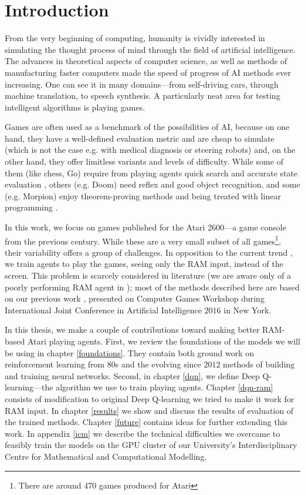 \chapter*{Introduction}
From the very beginning of computing, humanity is vividly interested in simulating the thought process of mind through the field of artificial intelligence. The advances in theoretical aspects of computer science, as well as methods of manufacturing faster computers made the speed of progress of AI methods ever increasing. One can see it in many domains---from self-driving cars, through machine translation, to speech synthesis. A particularly neat area for testing intelligent algorithms is playing games.

Games are often used as a benchmark of the possibilities of AI, because on one hand, they have a well-defined evaluation metric and are cheap to simulate (which is not the case e.g. with medical diagnosis or steering robots) and, on the other hand, they offer limitless variants and levels of difficulty. While some of them (like chess, Go) require from playing agents quick search and accurate state evaluation \cite{alphago}, others (e.g. Doom) need reflex and good object recognition, and some (e.g. Morpion) enjoy theorem-proving methods and being treated with linear programming \cite{morpion}.


In this work, we focus on games published for the Atari 2600---a game console from the previous century. While these are a very small subset of all games\footnote{There are around 470 games produced for Atari}, their variability offers a group of challenges. In opposition to the current trend \cite{nips-dqn, nature-dqn, a3c}, we train agents to play the games, seeing only the RAM input, instead of the screen. This problem is scarcely considered in literature (we are aware only of a poorly performing RAM agent in \cite{ale}); most of the methods described here are based on our previous work \cite{our-paper}, presented on Computer Games Workshop during International Joint Conference in Artificial Intelligence $2016$ in New York.

In this thesis, we make a couple of contributions toward making better RAM-based Atari playing agents. First, we review the foundations of the models we will be using in chapter \ref{foundations}. They contain both ground work on reinforcement learning from 80s and the evolving since $2012$ methods of building and training neural networks.
Second, in chapter \ref{dqn}, we define Deep Q-learning---the algorithm we use to train playing agents.
Chapter \ref{dqn-ram} consists of modification to original Deep Q-learning we tried to make it work for RAM input.
In chapter \ref{results} we show and discuss the results of evaluation of the trained methods.
Chapter \ref{future} contains ideas for further extending this work.
In appendix \ref{icm} we describe the technical difficulties we overcame to feasibly train the models on the GPU cluster of our University's Interdisciplinary Centre for Mathematical and Computational Modelling.
\iffalse
\section*{Acknowledgements}
\addcontentsline{toc}{section}{Acknowledgements}
First of all, I would like to thank dr hab. Henryk Michalewski 
\todo{Acknowledgements to Marc, Henryk, ICM \& Deepsense.io}
\fi
